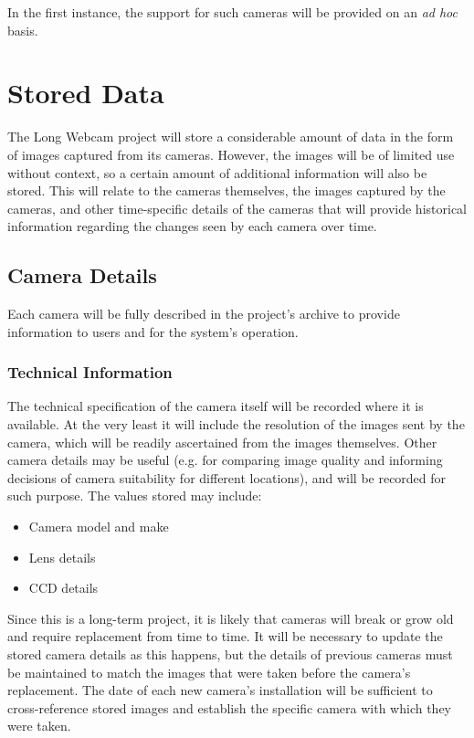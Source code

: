 \documentclass[11pt]{article}
\begin{document}
In the first instance, the support for such cameras will be provided on an \textit{ad hoc} basis.

\clearpage
\section{Stored Data}

The Long Webcam project will store a considerable amount of data in the form of images captured from its cameras. However, the images will be of limited use without context, so a certain amount of additional information will also be stored. This will relate to the cameras themselves, the images captured by the cameras, and other time-specific details of the cameras that will provide historical information regarding the changes seen by each camera over time.

\subsection{Camera Details}

Each camera will be fully described in the project's archive to provide information to users and for the system's operation.

\subsubsection{Technical Information}

The technical specification of the camera itself will be recorded where it is available. At the very least it will include the resolution of the images sent by the camera, which will be readily ascertained from the images themselves. Other camera details may be useful (e.g. for comparing image quality and informing decisions of camera suitability for different locations), and will be recorded for such purpose. The values stored may include:

\begin{itemize}
\item Camera model and make
\item Lens details
\item CCD details
\end{itemize}

Since this is a long-term project, it is likely that cameras will break or grow old and require replacement from time to time. It will be necessary to update the stored camera details as this happens, but the details of previous cameras must be maintained to match the images that were taken before the camera's replacement. The date of each new camera's installation will be sufficient to cross-reference stored images and establish the specific camera with which they were taken.
\end{document}
